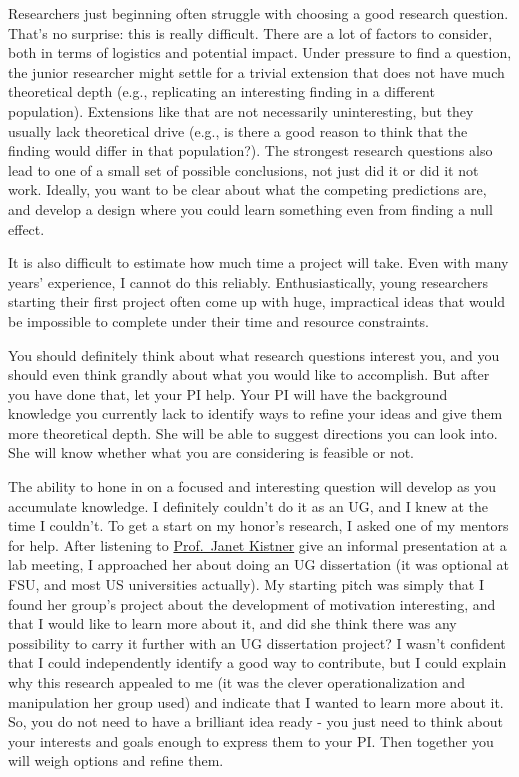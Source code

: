 \documentclass[
  12pt,
]{book}
\begin{document}
Researchers just beginning often struggle with choosing a good research question. That's no surprise: this is really difficult. There are a lot of factors to consider, both in terms of logistics and potential impact. Under pressure to find a question, the junior researcher might settle for a trivial extension that does not have much theoretical depth (e.g., replicating an interesting finding in a different population). Extensions like that are not necessarily uninteresting, but they usually lack theoretical drive (e.g., is there a good reason to think that the finding would differ in that population?). The strongest research questions also lead to one of a small set of possible conclusions, not just did it or did it not work. Ideally, you want to be clear about what the competing predictions are, and develop a design where you could learn something even from finding a null effect.

It is also difficult to estimate how much time a project will take. Even with many years' experience, I cannot do this reliably. Enthusiastically, young researchers starting their first project often come up with huge, impractical ideas that would be impossible to complete under their time and resource constraints.

You should definitely think about what research questions interest you, and you should even think grandly about what you would like to accomplish. But after you have done that, let your PI help. Your PI will have the background knowledge you currently lack to identify ways to refine your ideas and give them more theoretical depth. She will be able to suggest directions you can look into. She will know whether what you are considering is feasible or not.

The ability to hone in on a focused and interesting question will develop as you accumulate knowledge. I definitely couldn't do it as an UG, and I knew at the time I couldn't. To get a start on my honor's research, I asked one of my mentors for help. After listening to \href{https://provost.fsu.edu/about/janet-kistner}{Prof.~Janet Kistner} give an informal presentation at a lab meeting, I approached her about doing an UG dissertation (it was optional at FSU, and most US universities actually). My starting pitch was simply that I found her group's project about the development of motivation interesting, and that I would like to learn more about it, and did she think there was any possibility to carry it further with an UG dissertation project? I wasn't confident that I could independently identify a good way to contribute, but I could explain why this research appealed to me (it was the clever operationalization and manipulation her group used) and indicate that I wanted to learn more about it. So, you do not need to have a brilliant idea ready - you just need to think about your interests and goals enough to express them to your PI. Then together you will weigh options and refine them.
\end{document}
